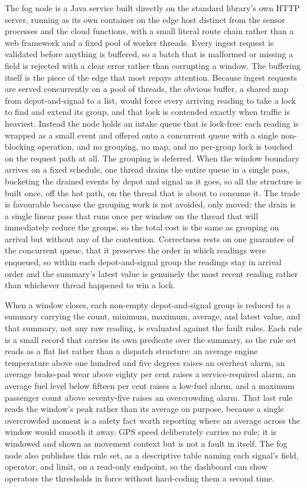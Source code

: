\documentclass[conference]{IEEEtran}
\begin{document}
The fog node is a Java service built directly on the standard library's own HTTP server, running as its own container on the edge host distinct from the sensor processes and the cloud functions, with a small literal route chain rather than a web framework and a fixed pool of worker threads. Every ingest request is validated before anything is buffered, so a batch that is malformed or missing a field is rejected with a clear error rather than corrupting a window. The buffering itself is the piece of the edge that most repays attention. Because ingest requests are served concurrently on a pool of threads, the obvious buffer, a shared map from depot-and-signal to a list, would force every arriving reading to take a lock to find and extend its group, and that lock is contended exactly when traffic is heaviest. Instead the node holds an intake queue that is lock-free: each reading is wrapped as a small event and offered onto a concurrent queue with a single non-blocking operation, and no grouping, no map, and no per-group lock is touched on the request path at all. The grouping is deferred. When the window boundary arrives on a fixed schedule, one thread drains the entire queue in a single pass, bucketing the drained events by depot and signal as it goes, so all the structure is built once, off the hot path, on the thread that is about to consume it. The trade is favourable because the grouping work is not avoided, only moved: the drain is a single linear pass that runs once per window on the thread that will immediately reduce the groups, so the total cost is the same as grouping on arrival but without any of the contention. Correctness rests on one guarantee of the concurrent queue, that it preserves the order in which readings were enqueued, so within each depot-and-signal group the readings stay in arrival order and the summary's latest value is genuinely the most recent reading rather than whichever thread happened to win a lock.

When a window closes, each non-empty depot-and-signal group is reduced to a summary carrying the count, minimum, maximum, average, and latest value, and that summary, not any raw reading, is evaluated against the fault rules. Each rule is a small record that carries its own predicate over the summary, so the rule set reads as a flat list rather than a dispatch structure: an average engine temperature above one hundred and five degrees raises an overheat alarm, an average brake-pad wear above eighty per cent raises a service-required alarm, an average fuel level below fifteen per cent raises a low-fuel alarm, and a maximum passenger count above seventy-five raises an overcrowding alarm. That last rule reads the window's peak rather than its average on purpose, because a single overcrowded moment is a safety fact worth reporting where an average across the window would smooth it away. GPS speed deliberately carries no rule; it is windowed and shown as movement context but is not a fault in itself. The fog node also publishes this rule set, as a descriptive table naming each signal's field, operator, and limit, on a read-only endpoint, so the dashboard can show operators the thresholds in force without hard-coding them a second time.
\end{document}
